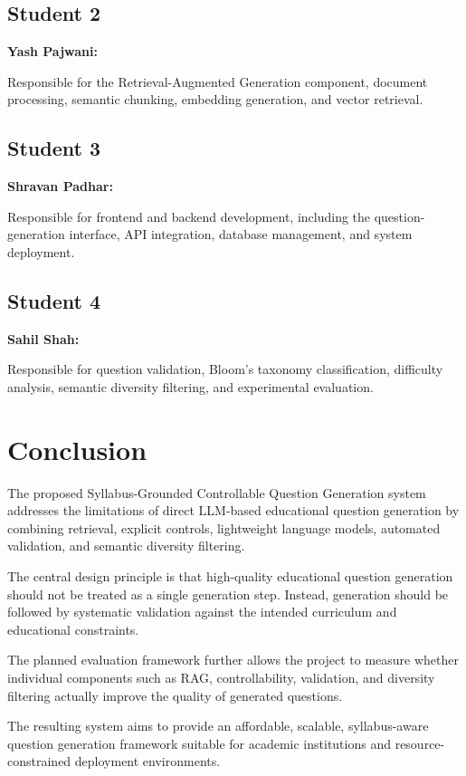 \documentclass[12pt,a4paper]{report}
\begin{document}
\section*{Student 2}

\textbf{Yash Pajwani:}

Responsible for the Retrieval-Augmented Generation component, document processing, semantic chunking, embedding generation, and vector retrieval.

\section*{Student 3}

\textbf{Shravan Padhar:}

Responsible for frontend and backend development, including the question-generation interface, API integration, database management, and system deployment.

\section*{Student 4}

\textbf{Sahil Shah:}

Responsible for question validation, Bloom's taxonomy classification, difficulty analysis, semantic diversity filtering, and experimental evaluation.


\chapter*{Conclusion}

The proposed Syllabus-Grounded Controllable Question Generation system addresses the limitations of direct LLM-based educational question generation by combining retrieval, explicit controls, lightweight language models, automated validation, and semantic diversity filtering.

The central design principle is that high-quality educational question generation should not be treated as a single generation step. Instead, generation should be followed by systematic validation against the intended curriculum and educational constraints.

The planned evaluation framework further allows the project to measure whether individual components such as RAG, controllability, validation, and diversity filtering actually improve the quality of generated questions.

The resulting system aims to provide an affordable, scalable, syllabus-aware question generation framework suitable for academic institutions and resource-constrained deployment environments.

\end{document}
